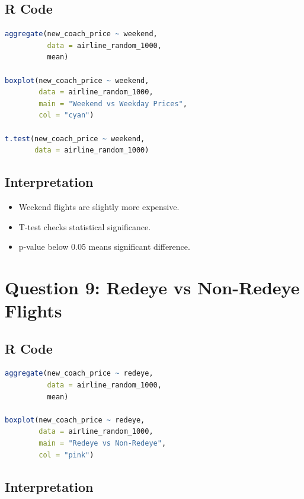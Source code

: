 \documentclass[12pt,a4paper]{article}
\begin{document}
\subsection{R Code}

\begin{lstlisting}[language=R]
aggregate(new_coach_price ~ weekend,
          data = airline_random_1000,
          mean)

boxplot(new_coach_price ~ weekend,
        data = airline_random_1000,
        main = "Weekend vs Weekday Prices",
        col = "cyan")

t.test(new_coach_price ~ weekend,
       data = airline_random_1000)
\end{lstlisting}

\subsection{Interpretation}

\begin{itemize}
\item Weekend flights are slightly more expensive.
\item T-test checks statistical significance.
\item p-value below 0.05 means significant difference.
\end{itemize}


\section{Question 9: Redeye vs Non-Redeye Flights}

\subsection{R Code}

\begin{lstlisting}[language=R]
aggregate(new_coach_price ~ redeye,
          data = airline_random_1000,
          mean)

boxplot(new_coach_price ~ redeye,
        data = airline_random_1000,
        main = "Redeye vs Non-Redeye",
        col = "pink")
\end{lstlisting}

\subsection{Interpretation}
\end{document}
